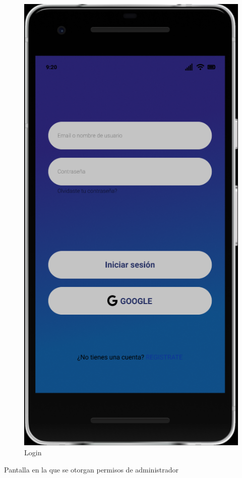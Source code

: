 \documentclass{article}
\begin{document}
\begin{figure}[H]
    \centering
    \includegraphics[scale=0.8]{imgs/Figma/Login}
    \caption{Login}
\end{figure}
Pantalla en la que se otorgan permisos de administrador
\end{document}
